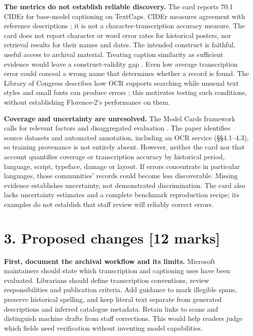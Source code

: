 \documentclass[11pt,letterpaper]{article}
\begin{document}
\textbf{The metrics do not establish reliable discovery.} The card reports 70.1 CIDEr for base-model captioning on TextCaps. CIDEr measures agreement with reference descriptions \citep{vedantam2015}; it is not a character-transcription accuracy measure. The card does not report character or word error rates for historical posters, nor retrieval results for their names and dates. The intended construct is faithful, useful access to archival material. Treating caption similarity as sufficient evidence would leave a construct-validity gap \citep[\S3.2]{jacobs2021}. Even low average transcription error could conceal a wrong name that determines whether a record is found. The Library of Congress describes how OCR supports searching while unusual text styles and small fonts can produce errors \citep{locOCR}; this motivates testing such conditions, without establishing Florence-2's performance on them.

\newpage
\textbf{Coverage and uncertainty are unresolved.} The Model Cards framework calls for relevant factors and disaggregated evaluation \citep[\S\S4.3, 4.7]{mitchell2019}. The paper identifies source datasets and automated annotation, including an OCR service (\S\S4.1--4.3), so training provenance is not entirely absent. However, neither the card nor that account quantifies coverage or transcription accuracy by historical period, language, script, typeface, damage or layout. If errors concentrate in particular languages, those communities' records could become less discoverable. Missing evidence establishes uncertainty, not demonstrated discrimination. The card also lacks uncertainty estimates and a complete benchmark reproduction recipe; its examples do not establish that staff review will reliably correct errors.

\section*{3. Proposed changes [12 marks]}
\textbf{First, document the archival workflow and its limits.} Microsoft maintainers should state which transcription and captioning uses have been evaluated. Librarians should define transcription conventions, review responsibilities and publication criteria. Add guidance to mark illegible spans, preserve historical spelling, and keep literal text separate from generated descriptions and inferred catalogue metadata. Retain links to scans and distinguish machine drafts from staff corrections. This would help readers judge which fields need verification without inventing model capabilities.
\end{document}
